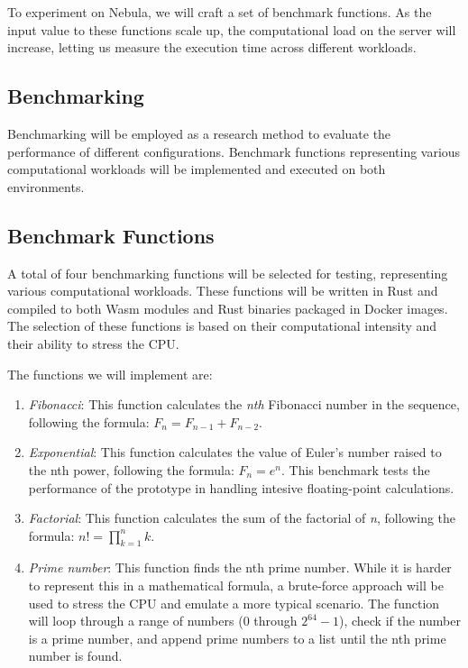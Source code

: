 \documentclass[
  table]{report}
\providecommand{\tightlist}{%
  \setlength{\itemsep}{0pt}\setlength{\parskip}{0pt}}
\begin{document}
To experiment on Nebula, we will craft a set of benchmark functions. As
the input value to these functions scale up, the computational load on
the server will increase, letting us measure the execution time across
different workloads.

\subsection{Benchmarking}
\label{sect:benchmark}

Benchmarking will be employed as a research method to evaluate the
performance of different configurations. Benchmark functions
representing various computational workloads will be implemented and
executed on both environments.

\subsection{Benchmark Functions}
\label{sect:bench_funct}

A total of four benchmarking functions will be selected for testing,
representing various computational workloads. These functions will be
written in Rust and compiled to both \ac{Wasm} modules and Rust binaries
packaged in Docker images. The selection of these functions is based on
their computational intensity and their ability to stress the CPU.

The functions we will implement are:

\begin{enumerate}
\def\labelenumi{\arabic{enumi}.}
\tightlist
\item
  \emph{Fibonacci}: This function calculates the \emph{nth} Fibonacci
  number in the sequence, following the formula:
  \(F_n = F_{n-1} + F_{n-2}\).
\item
  \emph{Exponential}: This function calculates the value of Euler's
  number raised to the nth power, following the formula: \(F_n = e^n\).
  This benchmark tests the performance of the prototype in handling
  intesive floating-point calculations.
\item
  \emph{Factorial}: This function calculates the sum of the factorial of
  \emph{n}, following the formula: \(n! = \prod_{k=1}^n k\).
\item
  \emph{Prime number}: This function finds the nth prime number. While
  it is harder to represent this in a mathematical formula, a
  brute-force approach will be used to stress the CPU and emulate a more
  typical scenario. The function will loop through a range of numbers (0
  through \(2^{64} - 1\)), check if the number is a prime number, and
  append prime numbers to a list until the nth prime number is found.
\end{enumerate}
\end{document}
